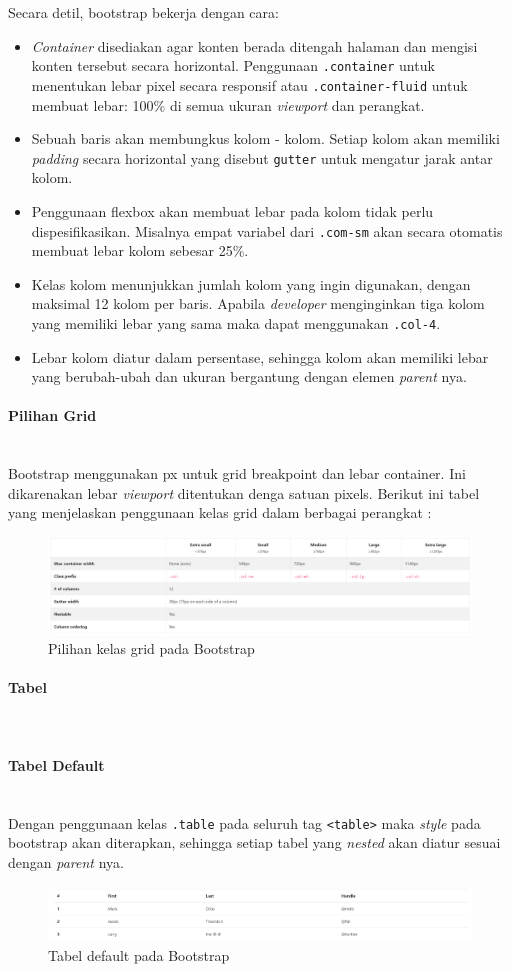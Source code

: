 \documentclass[a4paper,twoside]{article}
\newcommand{\myparagraph}[1]{\paragraph{#1}\mbox{}\\}
\begin{document}
\begin{enumerate}
		Secara detil, bootstrap bekerja dengan cara:
		\begin{itemize}
			\item \textit{Container} disediakan agar konten berada ditengah halaman dan mengisi konten tersebut secara horizontal. Penggunaan \verb|.container| untuk menentukan lebar pixel secara responsif atau \verb|.container-fluid| untuk membuat lebar: 100\%  di semua ukuran \textit{viewport} dan perangkat.
			\item Sebuah baris akan membungkus kolom - kolom. Setiap kolom akan memiliki \textit{padding} secara horizontal yang disebut \verb|gutter| untuk mengatur jarak antar kolom.
			\item Penggunaan flexbox akan membuat lebar pada kolom tidak perlu dispesifikasikan. Misalnya empat variabel dari \verb|.com-sm| akan secara otomatis membuat lebar kolom sebesar 25\%.
			\item Kelas kolom menunjukkan jumlah kolom yang ingin digunakan, dengan maksimal 12 kolom per baris. Apabila \textit{developer} menginginkan tiga kolom yang memiliki lebar yang sama maka dapat menggunakan \colorbox{mygray}{\texttt{.col-4}}.
			\item Lebar kolom diatur dalam persentase, sehingga kolom akan memiliki lebar yang berubah-ubah dan ukuran bergantung dengan elemen \textit{parent} nya.
		\end{itemize}
		\myparagraph{Pilihan Grid}
		Bootstrap menggunakan px untuk grid breakpoint dan lebar container. Ini dikarenakan lebar \textit{viewport} ditentukan denga satuan pixels.
		Berikut ini tabel yang menjelaskan penggunaan kelas grid dalam berbagai perangkat :
		\begin{figure} [H]
			\centering  
			\includegraphics[scale=0.7]{gridoption_bootstrap.png}  
			\caption{Pilihan kelas grid pada Bootstrap} 
		\end{figure}
		
		\myparagraph{Tabel}
		\myparagraph{Tabel Default}
		Dengan penggunaan kelas \verb|.table| pada seluruh tag \colorbox{mygray}{\texttt{<table>}} maka \textit{style} pada bootstrap akan diterapkan, sehingga setiap tabel yang \textit{nested} akan diatur sesuai dengan \textit{parent} nya.
		\begin{figure} [H]
			\centering  
			\includegraphics[scale=0.7]{tablebasic_bootstrap.png}  
			\caption{Tabel default pada Bootstrap} 
		\end{figure}
		

\end{enumerate}
\end{document}
